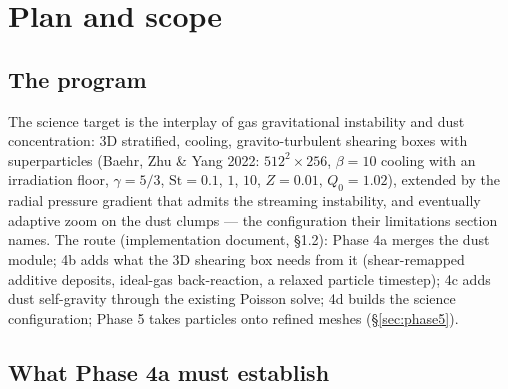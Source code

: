 \documentclass[11pt]{article}
\begin{document}
\begin{abstract}
\textbf{Phase 6} takes the particles onto adaptively refined meshes. A lattice at the
finest spacing passes through a refine and a derefine event with its equilibrium held to
round-off ($10^{-15}$ to $10^{-13}$), a structured state is rank-independent to $10^{-12}$
while the load balance moves MeshBlocks between ranks, the uniform regression is bit for
bit, and the three lattice configurations that do drift are traced to the two-lattice
interface term of Phase 5, the last of them (the finest lattice split on refinement) with
its $7/8$ and $9/8$ measured. On the science side both Johansen \& Youdin (2007)
nonlinear runs are set up with their finest level at the published resolution and a root
grid as coarse as $0.8$ cells per $\eta r$; run~BA reproduces their morphology, including
the box-spanning filament, on $54\%$ of the cells of the uniform mesh.
\end{abstract}

\tableofcontents
\newpage

\section{Plan and scope}
\label{sec:plan}

\subsection{The program}

The science target is the interplay of gas gravitational instability and dust
concentration: 3D stratified, cooling, gravito-turbulent shearing boxes with
superparticles (Baehr, Zhu \& Yang 2022: $512^2\times256$, $\beta = 10$ cooling with an
irradiation floor, $\gamma = 5/3$, $\mathrm{St} = 0.1$, $1$, $10$, $Z = 0.01$,
$Q_0 = 1.02$), extended by the radial pressure gradient that admits the streaming
instability, and eventually adaptive zoom on the dust clumps --- the configuration
their limitations section names. The route (implementation document, \S1.2):
Phase 4a merges the dust module; 4b adds what the 3D shearing box needs from it
(shear-remapped additive deposits, ideal-gas back-reaction, a relaxed particle
timestep); 4c adds dust self-gravity through the existing Poisson solve; 4d builds
the science configuration; Phase 5 takes particles onto refined meshes (\S\ref{sec:phase5}).

\subsection{What Phase 4a must establish}
\end{document}
